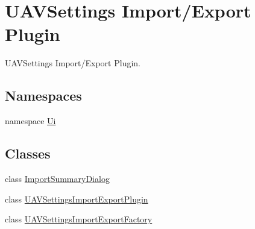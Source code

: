 \hypertarget{group___u_a_v_settings_import_export}{\section{U\-A\-V\-Settings Import/\-Export Plugin}
\label{group___u_a_v_settings_import_export}
}


U\-A\-V\-Settings Import/\-Export Plugin.  


\subsection*{Namespaces}
\begin{DoxyCompactItemize}
\item 
namespace \hyperlink{namespace_ui}{Ui}
\end{DoxyCompactItemize}
\subsection*{Classes}
\begin{DoxyCompactItemize}
\item 
class \hyperlink{class_import_summary_dialog}{Import\-Summary\-Dialog}
\item 
class \hyperlink{class_u_a_v_settings_import_export_plugin}{U\-A\-V\-Settings\-Import\-Export\-Plugin}
\item 
class \hyperlink{class_u_a_v_settings_import_export_factory}{U\-A\-V\-Settings\-Import\-Export\-Factory}
\end{DoxyCompactItemize}
